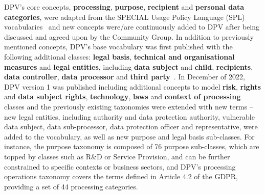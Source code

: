 DPV's core concepts, \textbf{processing}, \textbf{purpose}, \textbf{recipient} and \textbf{personal data categories}, were adapted from the SPECIAL Usage Policy Language (SPL) vocabularies~\citep{bonatti_policy_2018} and new concepts were/are continuously added to DPV after being discussed and agreed upon by the Community Group.
In addition to previously mentioned concepts, DPV's base vocabulary was first published with the following additional classes: \textbf{legal basis}, \textbf{technical and organisational measures} and \textbf{legal entities}, including \textbf{data subject} and \textbf{child}, \textbf{recipients}, \textbf{data controller}, \textbf{data processor} and \textbf{third party}~\citep{panetto_creating_2019}.
In December of 2022, DPV version 1 was published including additional concepts to model \textbf{risk}, \textbf{rights} and \textbf{data subject rights}, \textbf{technology}, \textbf{laws} and \textbf{context of processing} classes and the previously existing taxonomies were extended with new terms -- new legal entities, including authority and data protection authority, vulnerable data subject, data sub-processor, data protection officer and representative, were added to the vocabulary, as well as new purpose and legal basis sub-classes.
For instance, the purpose taxonomy is composed of 76 purpose sub-classes, which are topped by classes such as R\&D or Service Provision, and can be further constrained to specific contexts or business sectors, and DPV's processing operations taxonomy covers the terms defined in Article 4.2 of the GDPR, providing a set of 44 processing categories.

